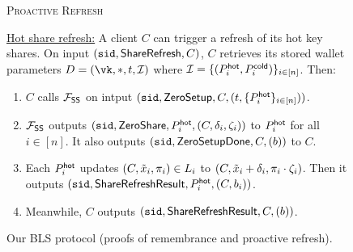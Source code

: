 \begin{figure*}
\begin{mdframed}
\begin{enumerate}
    \end{enumerate}
    \begin{center}
        \textsc{Proactive Refresh}
    \end{center}
    \underline{Hot share refresh:} A client $C$ can trigger a refresh of its hot key shares. On input $(\texttt{sid}, \mathsf{ShareRefresh}, C)$,
    $C$ retrieves its stored wallet parameters $\clientlist = (\vk, *, t, \mathcal{I})$ where $\mathcal{I} = \{(P_i^{\mathsf{hot}}, P_i^{\mathsf{cold}})\}_{i \in [n]}$. Then:
    \begin{enumerate}
        \item $C$ calls $\mathcal{F}_\mathsf{SS}$ on intput $(\texttt{sid}, \mathsf{ZeroSetup}, C, (t, \{P_i^{\mathsf{hot}}\}_{i \in [n]}))$.
        \item $\mathcal{F}_\mathsf{SS}$ outputs $(\texttt{sid}, \mathsf{ZeroShare}, P_i^{\mathsf{hot}}, (C, \delta_i, \zeta_i))$ to $P_i^{\mathsf{hot}}$ for all $i \in [n]$. It also outputs $(\texttt{sid},\allowbreak \mathsf{ZeroSetupDone}, C, (b))$ to $C$.
        \item Each $P_i^{\mathsf{hot}}$ 
        updates $(C, \tilde{x}_i, \pi_i) \in L_i$ to $(C, \tilde{x}_i + \delta_i,\allowbreak \pi_i \cdot \zeta_i)$. Then it outputs $(\texttt{sid}, \mathsf{ShareRefreshResult},\allowbreak P_i^{\mathsf{hot}}, (C, b_i))$.
        \item Meanwhile, $C$ outputs $(\texttt{sid}, \mathsf{ShareRefreshResult}, C, (b))$.
    \end{enumerate}
    \end{mdframed}
    \caption{Our BLS \hcwl protocol (proofs of remembrance and proactive refresh).}
    \label{fig:hc_bls2}
\end{figure*}